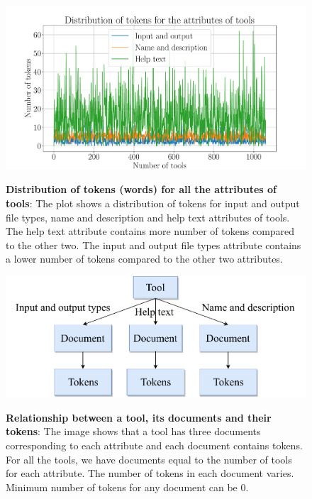 \begin{figure}[h]
\begin{centering}
    {\includegraphics[scale=0.4]{figures/Tokens_dist.pdf}}
    \caption[Distribution of tokens for all the attributes of tools]{\textbf{Distribution of tokens (words) for all the attributes of tools}: The plot shows a distribution of tokens for input and output file types, name and description and help text attributes of tools. The help text attribute contains more number of tokens compared to the other two. The input and output file types attribute contains a lower number of tokens compared to the other two attributes. }
\end{centering}
\end{figure}

\begin{figure}[h]
\begin{centering}
    {\includegraphics[scale=0.7]{figures/tool-document-tokens.pdf}}
    \caption[Tool, document and tokens]{\textbf{Relationship between a tool, its documents and their tokens}: The image shows that a tool has three documents corresponding to each attribute and each document contains tokens. For all the tools, we have documents equal to the number of tools for each attribute. The number of tokens in each document varies. Minimum number of tokens for any document can be 0.}
\end{centering}
\end{figure}

